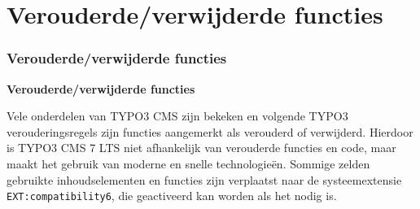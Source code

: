 %

\section{Verouderde/verwijderde functies}
\begin{frame}[fragile]
	\frametitle{Verouderde/verwijderde functies}

	\begin{center}\huge{\color{typo3darkgrey}\textbf{Verouderde/verwijderde functies}}\end{center}

	Vele onderdelen van TYPO3 CMS zijn bekeken en volgende TYPO3 verouderingsregels
	zijn functies aangemerkt als verouderd of verwijderd.\newline
	Hierdoor is TYPO3 CMS 7 LTS niet afhankelijk van verouderde functies en code,
	maar maakt het gebruik van moderne en snelle technologieën.\newline
	Sommige zelden gebruikte inhoudselementen en functies zijn verplaatst naar de
	systeemextensie \texttt{EXT:compatibility6}, die geactiveerd kan worden als het
	nodig is.

\end{frame}

